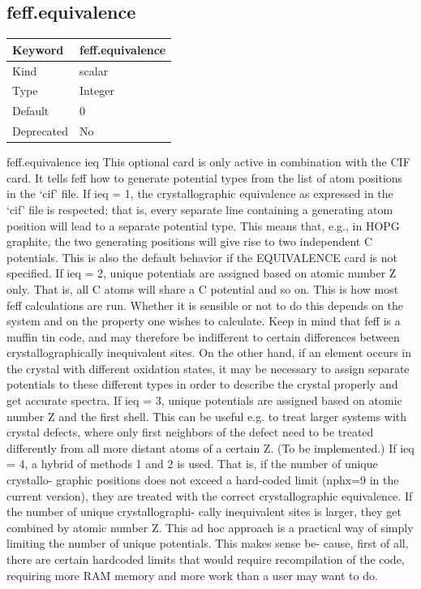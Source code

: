 \documentclass[11pt]{article}
\begin{document}
{{{\subsection{feff.equivalence}
\label{kw:feff-equivalence}
\begin{longtable}{|p{1.5in}|p{4.5in}|}
\hline
Keyword & feff.equivalence \\
\hline
Kind & scalar \\
\hline
Type & Integer \\
\hline
Default & 0 \\
\hline
Deprecated & No \\
\hline
\end{longtable}
 feff.equivalence{ ieq }
 This optional card is only active in combination with the CIF card. It tells feff how to
 generate potential types from the list of atom positions in the ‘cif’ file.
 If ieq = 1, the crystallographic equivalence as expressed in the ‘cif’ file is respected; that
 is, every separate line containing a generating atom position will lead to a separate potential
 type. This means that, e.g., in HOPG graphite, the two generating positions will give rise to
 two independent C potentials. This is also the default behavior if the EQUIVALENCE card is
 not specified.
 If ieq = 2, unique potentials are assigned based on atomic number Z only. That is, all
 C atoms will share a C potential and so on. This is how most feff calculations are run.
 Whether it is sensible or not to do this depends on the system and on the property one wishes
 to calculate. Keep in mind that feff is a muffin tin code, and may therefore be indifferent
 to certain differences between crystallographically inequivalent sites. On the other hand, if
 an element occurs in the crystal with different oxidation states, it may be necessary to assign
 separate potentials to these different types in order to describe the crystal properly and get
 accurate spectra.
 If ieq = 3, unique potentials are assigned based on atomic number Z and the first shell.
 This can be useful e.g. to treat larger systems with crystal defects, where only first neighbors
 of the defect need to be treated differently from all more distant atoms of a certain Z. (To be
 implemented.)
 If ieq = 4, a hybrid of methods 1 and 2 is used. That is, if the number of unique crystallo-
 graphic positions does not exceed a hard-coded limit (nphx=9 in the current version), they are
 treated with the correct crystallographic equivalence. If the number of unique crystallographi-
 cally inequivalent sites is larger, they get combined by atomic number Z. This ad hoc approach
 is a practical way of simply limiting the number of unique potentials. This makes sense be-
 cause, first of all, there are certain hardcoded limits that would require recompilation of the
 code, requiring more RAM memory and more work than a user may want to do.

}}}
\end{document}
